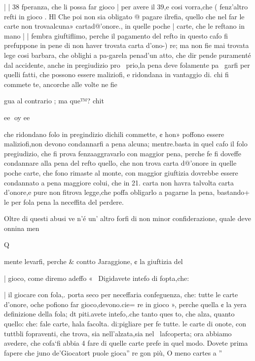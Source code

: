 \documentclass[12pt,a6paper]{article}
\begin{document}
 

 

 
 

| | 38
 fperanza, che li possa far gioco
| per avere il 39,e cosi vorra,che
( fenz’altro refti in gioco .
Hl Che poi non sia obligato @
pagare ilrefia, quello che nel
far le carte non trovaalcuna»
cartad@’onore., in quelle poche
| carte, che le reftano in mano
| | fembra giuftiflimo, perche il
pagamento del refto in questo
cafo fi prefuppone in pene di
non haver trovata carta d’ono-)
re; ma non fie mai trovata lege
cosi barbara, che oblighi a pa-garela penad'un atto, che dir
pende puramenté dal accidente, anche in pregiudizio pro~
prio,la pena deve folamente pa~
garfi per quelli fatti, che possono essere maliziofi, e ridondana
in vantaggio di. chi fi commete
te, ancorche alle volte ne fie

gua al contrario ; ma que™?
chit

 

 

 

 

ee
oy ee

che ridondano folo in pregindizio dichili commette, ¢ hon»
poffono essere maliziofi,non devono condannarfi a pena alcuna; mentre.basta in quel cafo il
folo pregiudizio, che fi prova
fenzaaggravarlo con maggior
pena, perche fe fi doveffe condannare alla pena del refto quello, che non trova carta d@’onore
in quelle poche carte, che fono
rimaste al monte, con maggior
giuftizia dovrebbe essere condannato a pena maggiore colui,
che in 21. carta non havra talvolta carta d’onore,e pure non
fitrova legge,che poffa obligarlo a pagarne la pena, bastando+
le per fola pena la neceffita del
perdere.

Oltre di questi abusi ve n’é un’
altro forfi di non minor confiderazione, quale deve onnina
men
 

 

 
 

Q

mente levarfi, perche & contto
Jaraggione, ¢ la giuftizia del

| gioco, come diremo adeffo «
  ~Digidavete intefo di fopta,che:

| il giocare con fola,. porta seco
per neceffaria confeguenza, che:
tutte le carte d’onore, oche
pofiono far gioco,devono.cie=
re in gioco », perche quella ¢ la
yera definizione della fola; dt
piti.avete intefo,.che tanto ques
to, che alza, quanto quello: che:
fale carte, hala facolta. di:pigliare per fe tutte. le carte di
onote, con tuttbli fopraventi,
che trova, sia nell’alzata,sia nel~
lafcoperta; ora abbiamo avedere, che cofa‘fi abbia 4 fare di
quelle carte prefe in quel modo.
Dovete prima fapere che
juno de’Giocatort puole gioca”
re gon più, O meno cartes a ”
\end{document}
